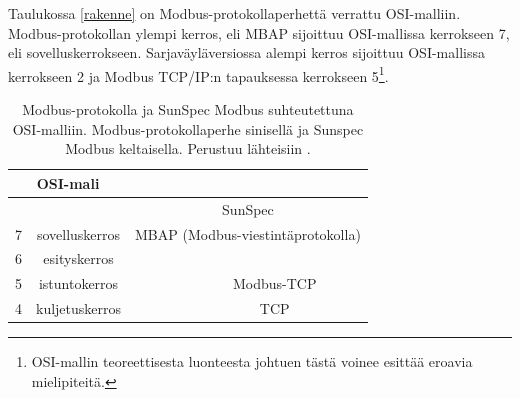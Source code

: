     Taulukossa \ref{rakenne} on Modbus-protokollaperhettä verrattu \gls{OSI}-malliin. Modbus-protokollan ylempi kerros, eli \gls{MBAP} sijoittuu \gls{OSI}-mallissa kerrokseen 7, eli sovelluskerrokseen. Sarjaväyläversiossa alempi kerros sijoittuu \gls{OSI}-mallissa kerrokseen 2 ja Modbus TCP/IP:n tapauksessa kerrokseen 5\footnote{\gls{OSI}-mallin teoreettisesta luonteesta johtuen tästä voinee esittää eroavia mielipiteitä.}.
    \begin{table}
      \centering
      \caption[Modbus-protokollan rakenne, \gls{OSI}-malli ja SunSpec]{Modbus-protokolla ja  SunSpec Modbus suhteutettuna \gls{OSI}-malliin. Modbus-protokollaperhe sinisellä ja Sunspec Modbus keltaisella. Perustuu lähteisiin \parencite{osi, modbusSerialSpec, modbusTCPIPSpec, SSTech}.}
      \begin{tabular}{|c|c|ccc}
      \cline{1-2}
      \multicolumn{2}{|c|}{OSI-mali}                                               & \multicolumn{3}{c}{}                                                                                                                                                                \\ \hline
      \multicolumn{1}{|l|}{}                    &                                  & \multicolumn{3}{c|}{\cellcolor[HTML]{FFFFC7}SunSpec}                                                                                                                                \\ \cline{3-5}
      \multicolumn{1}{|l|}{\multirow{-2}{*}{7}} & \multirow{-2}{*}{sovelluskerros} & \multicolumn{3}{c|}{\cellcolor[HTML]{6F6FE6}\gls{MBAP} (Modbus-viestintäprotokolla)}                                                                                                      \\ \hline
      6                                         & esityskerros                     &                                                         &                                                           & \multicolumn{1}{c|}{}                                         \\ \cline{1-2} \cline{5-5}
      5                                         & istuntokerros                    &                                                         & \multicolumn{1}{c|}{}                                     & \multicolumn{1}{c|}{\cellcolor[HTML]{6F6FE6}Modbus-\gls{TCP}} \\ \cline{1-2} \cline{5-5}
      4                                         & kuljetuskerros                   &                                                         & \multicolumn{1}{c|}{}                                     & \multicolumn{1}{c|}{\gls{TCP}}                                \\ \cline{1-2} \cline{5-5}

\end{tabular}
\end{table}

